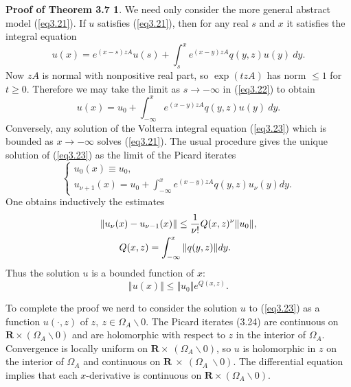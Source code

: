 \documentclass{surv-l}
\theoremstyle{plain}
\theoremstyle{definition}
\newtheorem*{pothm}{\sc Proof of Theorem 3.7}
\numberwithin{equation}{chapter}
\begin{document}
\begin{pothm}\label{pot3.7}
We need only consider the more general abstract model (\ref{eq3.21}). If $u$ satisfies (\ref{eq3.21}), then for any real $s$ and $x$ it satisfies the integral equation
\begin{equation}\label{eq3.22}
u(x)=e^{(x-s)zA}u(s)+\int_{s}^{x}e^{(x-y)zA}q(y, z)u(y)\ dy.
\end{equation}
Now $zA$ is normal with nonpositive real part, so $\exp(tzA)$ has norm $\leq 1$ for $t\geq 0$. Therefore we may take the limit as $ s\rightarrow-\infty$ in (\ref{eq3.22}) to obtain
\begin{equation}\label{eq3.23}
u(x)=u_{0}+\int_{-\infty}^{x}e^{(x-y)zA}q(y, z)u(y)\ dy.
\end{equation}
Conversely, any solution of the Volterra integral equation (\ref{eq3.23}) which is bounded as $ x\rightarrow-\infty$ solves (\ref{eq3.21}). The usual procedure gives the unique solution of (\ref{eq3.23}) as the limit of the Picard iterates
\begin{equation}\label{3.24}
\left\{\begin{array}{l}
u_{0}(x)\equiv u_{0},\\
u_{\nu+1}(x)=u_{0}+\int_{-\infty}^{x}e^{(x-y)zA}q(y,z)u_{\nu}(y) dy.
\end{array}\right.
\end{equation}
One obtains inductively the estimates
\begin{align}\label{eq3.25}
&\Vert u_{\nu}(x)-u_{\nu-1}(x)\Vert\leq\frac{1}{\nu!}Q(x, z)^{\nu}\Vert u_{0}\Vert,\\ \notag
&\qquad Q(x, z)=\int_{-\infty}^{x}\Vert q(y, z)\Vert dy.
\end{align}
Thus the solution $u$ is a bounded function of $x$:
\begin{equation}\label{eq3.26}
\Vert u(x)\Vert\leq\Vert u_{0}\Vert e^{Q(x,z)}.
\end{equation}

To complete the proof we nerd to consider the solution $u$ to (\ref{eq3.23}) as a function $u(\cdot, z)$ of $z,\ z\in\Omega_{A}\backslash 0$. The Picard iterates (3.24) are continuous on $\mathbf{R}\times(\Omega_{A}\backslash 0)$ and are holomorphic with respect to $z$ in the interior of $\Omega_{A}$. Convergence is locally uniform on $\mathbf{R} \times\ (\Omega_{A}\backslash 0)$, so $u$ is holomorphic in $z$ on the interior of $\Omega_{A}$ and continuous on $\mathbf{R}\ \times\ (\Omega_{A}\ \backslash 0)$. The differential equation implies that each $x$-derivative is continuous on $\mathbf{R}\times(\Omega_{A}\backslash 0)$.


\end{pothm}
\end{document}

